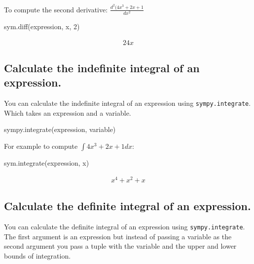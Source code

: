 To compute the second derivative: \(\frac{d ^ 2 (4 x ^ 3 + 2 x + 1}{dx ^ 2}\)




\begin{pyin}
sym.diff(expression, x, 2)
\end{pyin}




\begin{equation*}
\begin{split}\displaystyle 24 x\end{split}
\end{equation*}




\subsection{Calculate the indefinite integral of an expression.}
\label{\detokenize{tools-for-mathematics/03-calculus/how/main:calculate-the-indefinite-integral-of-an-expression}}

You can calculate the indefinite integral of an expression using
\texttt{sympy.integrate}. Which takes an expression and a variable.


\begin{pyin}
sympy.integrate(expression, variable)
\end{pyin}



For example to compute \(\int 4x^3 + 2x + 1 dx\):




\begin{pyin}
sym.integrate(expression, x)
\end{pyin}




\begin{equation*}
\begin{split}\displaystyle x^{4} + x^{2} + x\end{split}
\end{equation*}




\subsection{Calculate the definite integral of an expression.}
\label{\detokenize{tools-for-mathematics/03-calculus/how/main:calculate-the-definite-integral-of-an-expression}}

You can calculate the definite integral of an expression using
\texttt{sympy.integrate}. The first argument is an expression but instead of passing a
variable as the second argument you pass a tuple with the variable and the upper
and lower bounds of integration.


